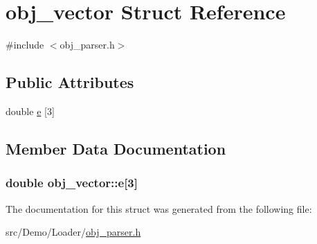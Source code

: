 \hypertarget{structobj__vector}{\section{obj\+\_\+vector Struct Reference}
\label{structobj__vector}
}


{\ttfamily \#include $<$obj\+\_\+parser.\+h$>$}

\subsection*{Public Attributes}
\begin{DoxyCompactItemize}
\item 
double \hyperlink{structobj__vector_a7a220179dc367fff3b43da470ac7b989}{e} \mbox{[}3\mbox{]}
\end{DoxyCompactItemize}


\subsection{Member Data Documentation}
\hypertarget{structobj__vector_a7a220179dc367fff3b43da470ac7b989}{
\subsubsection[{e}]{\setlength{\rightskip}{0pt plus 5cm}double obj\+\_\+vector\+::e\mbox{[}3\mbox{]}}}\label{structobj__vector_a7a220179dc367fff3b43da470ac7b989}


The documentation for this struct was generated from the following file\+:\begin{DoxyCompactItemize}
\item 
src/\+Demo/\+Loader/\hyperlink{obj__parser_8h}{obj\+\_\+parser.\+h}\end{DoxyCompactItemize}
